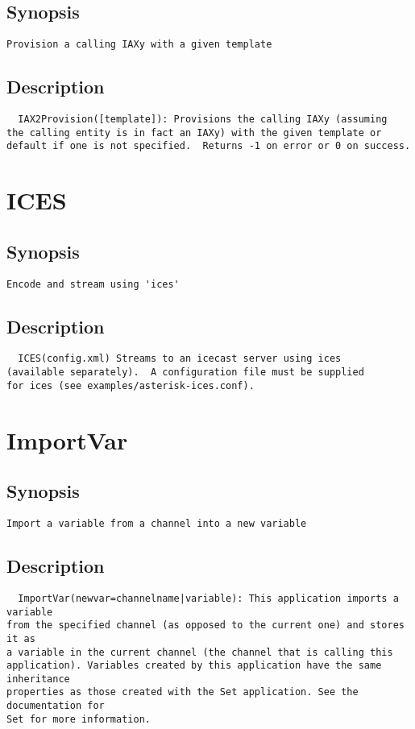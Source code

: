 \subsection{Synopsis}
\begin{verbatim}
Provision a calling IAXy with a given template
\end{verbatim}
\subsection{Description}
\begin{verbatim}
  IAX2Provision([template]): Provisions the calling IAXy (assuming
the calling entity is in fact an IAXy) with the given template or
default if one is not specified.  Returns -1 on error or 0 on success.

\end{verbatim}


\section{ICES}
\subsection{Synopsis}
\begin{verbatim}
Encode and stream using 'ices'
\end{verbatim}
\subsection{Description}
\begin{verbatim}
  ICES(config.xml) Streams to an icecast server using ices
(available separately).  A configuration file must be supplied
for ices (see examples/asterisk-ices.conf). 

\end{verbatim}


\section{ImportVar}
\subsection{Synopsis}
\begin{verbatim}
Import a variable from a channel into a new variable
\end{verbatim}
\subsection{Description}
\begin{verbatim}
  ImportVar(newvar=channelname|variable): This application imports a variable
from the specified channel (as opposed to the current one) and stores it as
a variable in the current channel (the channel that is calling this
application). Variables created by this application have the same inheritance
properties as those created with the Set application. See the documentation for
Set for more information.

\end{verbatim}


